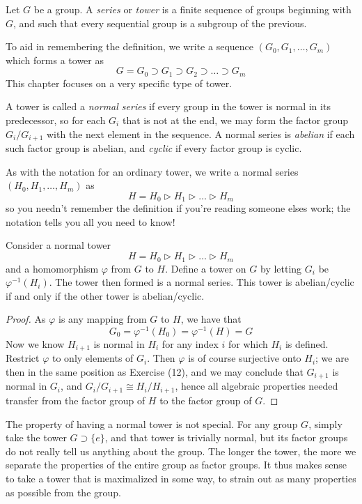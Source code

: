 Let $G$ be a group. A \emph{series}  or \emph{tower}  is a finite sequence of groups beginning with $G$, and such that every sequential group is a subgroup of the previous.

To aid in remembering the definition, we write a sequence $(G_0, G_1, \dots, G_m)$ which forms a tower as
%
\[ G = G_0 \supset G_1 \supset G_2 \supset \dots \supset G_m \]
%
This chapter focuses on a very specific type of tower.

A tower is called a \emph{normal series} if every group in the tower is normal in its predecessor, so for each $G_i$ that is not at the end, we may form the factor group $G_i/G_{i+1}$ with the next element in the sequence. A normal series is \emph{abelian} if each such factor group is abelian, and \emph{cyclic}  if every factor group is cyclic.

As with the notation for an ordinary tower, we write a normal series $(H_0, H_1, \dots, H_m)$ as
%
\[ H = H_0 \rhd H_1 \rhd \dots \rhd H_m \]
%
so you needn't remember the definition if you're reading someone elses work; the notation tells you all you need to know!

\begin{theorem}
    Consider a normal tower
    \[ H = H_0 \rhd H_1 \rhd \dots \rhd H_m \]
    and a homomorphism $\varphi$ from $G$ to $H$. Define a tower on $G$ by letting $G_i$ be $\varphi^{-1}(H_i)$. The tower then formed is a normal series. This tower is abelian/cyclic if and only if the other tower is abelian/cyclic.
\end{theorem}
\begin{proof}
    As $\varphi$ is any mapping from $G$ to $H$, we have that
    \[ G_0 = \varphi^{-1}(H_0) = \varphi^{-1}(H) = G \]
    Now we know $H_{i+1}$ is normal in $H_i$ for any index $i$ for which $H_i$ is defined. Restrict $\varphi$ to only elements of $G_i$. Then $\varphi$ is of course surjective onto $H_i$; we are then in the same position as Exercise (12), and we may conclude that $G_{i+1}$ is normal in $G_i$, and $G_i/G_{i+1} \cong H_i/H_{i+1}$, hence all algebraic properties needed transfer from the factor group of $H$ to the factor group of $G$.
\end{proof}

The property of having a normal tower is not special. For any group $G$, simply take the tower $G \supset \{e\}$, and that tower is trivially normal, but its factor groups do not really tell us anything about the group. The longer the tower, the more we separate the properties of the entire group as factor groups. It thus makes sense to take a tower that is maximalized in some way, to strain out as many properties as possible from the group.

